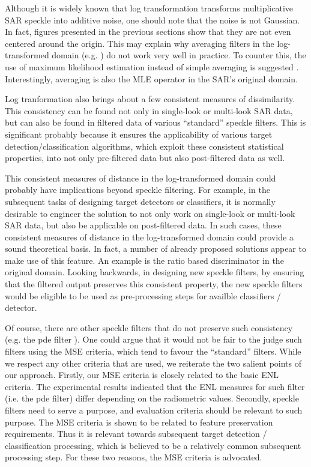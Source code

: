 \documentclass[journal]{IEEEtran}
\begin{document}
Although it is widely known that log transformation transforms multiplicative SAR speckle into additive noise, 
	one should note that the noise is not Gaussian. In fact, figures presented in the previous sections show that 
	they are not even centered around the origin. 
This may explain why averaging filters in the log-transformed domain (e.g. \cite{Arsenault_JOptSocAm_1976}) do not 
	work very well in practice. To counter this, the use of maximum likelihood estimation instead of simple averaging 
	is suggested \cite{Le_2011_ACRS}. Interestingly, averaging is also the MLE operator in the SAR's original domain.

Log tranformation also brings about a few consistent measures of dissimilarity.
	This consistency can be found not only in single-look or multi-look SAR data, 
	but can also be found in filtered data of various ``standard'' speckle filters.
This is significant probably because it ensures the applicability of various target detection/classification 
	algorithms, which exploit these consistent statistical properties, 
	into not only pre-filtered data but also post-filtered data as well.

This consistent measures of distance in the log-transformed domain could probably have implications beyond speckle 
filtering. For example, in the subsequent tasks of designing target detectors or classifiers, 
	it is normally desirable to engineer the solution to not only work on single-look or multi-look SAR data,
	but also be applicable on post-filtered data.
In such cases, these consistent measures of distance in the log-transformed domain could provide a sound theoretical
	basis. In fact, a number of already proposed solutions appear to make use of this feature. 
An example is the ratio based discriminator in the original domain. Looking backwards, in designing new speckle 
	filters, by ensuring that the filtered output preserves this consistent property,
	the new speckle filters would be eligible to be used as pre-processing steps for availble classifiers / detector.

Of course, there are other speckle filters that do not preserve such consistency 
	(e.g. the pde filter \cite{You_TIP_2000}). One could argue that it would not be fair to the judge such filters 
	using the MSE criteria, which tend to favour the ``standard'' filters.
While we respect any other criteria that are used, we reiterate the two salient points of our approach. 
Firstly, our MSE criteria is closely related to the basic ENL criteria.
The experimental results indicated that the ENL measures for such filter (i.e. the pde filter) differ depending  
on the radiometric values. 
Secondly, speckle filters need to serve a purpose, and evaluation criteria should be relevant to such purpose.
The MSE criteria is shown to be related to feature preservation requirements.
Thus it is relevant towards subsequent target detection / classification processing, 
	which is believed to be a relatively common subsequent processing step. 
For these two reasons, the MSE criteria is advocated.
\end{document}
